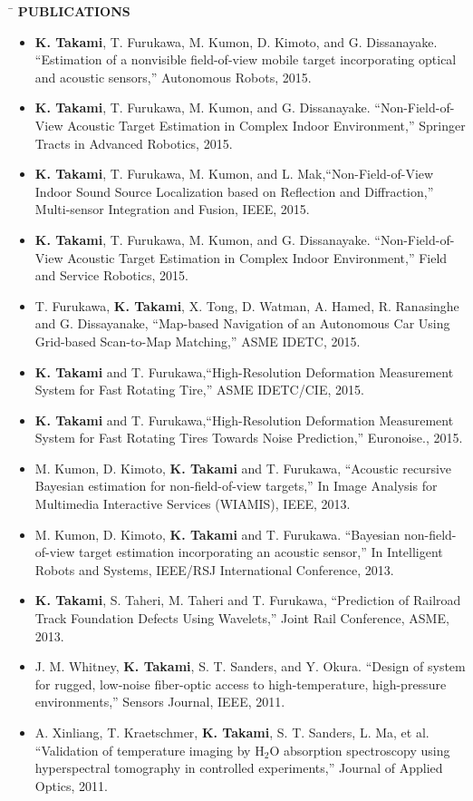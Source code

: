 \documentclass[11pt,letter]{article}
\begin{document}
\begin{tabbing}
	\hspace{2cm}\=\kill
	\>  {\bf \Large PUBLICATIONS}
\end{tabbing}
\vspace{-1.2cm}
\begin{tabbing}
\end{tabbing}
\begin{itemize}[leftmargin=*]
		\item {\bf K. Takami}, T. Furukawa, M. Kumon, D. Kimoto, and G. Dissanayake. ``Estimation of a nonvisible field-of-view mobile target incorporating optical and acoustic sensors,'' Autonomous Robots, 2015.
	\item {\bf K. Takami}, T. Furukawa, M. Kumon, and G. Dissanayake. ``Non-Field-of-View Acoustic Target Estimation in Complex Indoor Environment,'' Springer Tracts in Advanced Robotics, 2015.
	\item  {\bf K. Takami}, T. Furukawa, M. Kumon, and L. Mak,``Non-Field-of-View Indoor Sound Source Localization based on Reflection and Diffraction,'' Multi-sensor Integration and Fusion, IEEE, 2015.
	\item {\bf K. Takami}, T. Furukawa, M. Kumon, and G. Dissanayake. ``Non-Field-of-View Acoustic Target Estimation in Complex Indoor Environment,'' Field and Service Robotics, 2015.
	\item  T. Furukawa, {\bf K. Takami}, X. Tong, D. Watman, A. Hamed, R. Ranasinghe and G. Dissayanake, ``Map-based Navigation of an Autonomous Car Using Grid-based Scan-to-Map Matching,'' ASME IDETC, 2015.
	\item  {\bf K. Takami} and T. Furukawa,``High-Resolution Deformation Measurement System for Fast Rotating Tire,'' ASME IDETC/CIE, 2015.
	\item  {\bf K. Takami} and T. Furukawa,``High-Resolution Deformation Measurement System for Fast Rotating Tires Towards Noise Prediction,'' Euronoise., 2015.
	\item M. Kumon, D. Kimoto, {\bf K. Takami} and T. Furukawa, ``Acoustic recursive Bayesian estimation for non-field-of-view targets,'' In Image Analysis for Multimedia Interactive Services (WIAMIS), IEEE, 2013.
	\item M. Kumon, D. Kimoto, {\bf K. Takami} and T. Furukawa. ``Bayesian non-field-of-view target estimation incorporating an acoustic sensor,'' In Intelligent Robots and Systems, IEEE/RSJ International Conference, 2013.
	\item {\bf K. Takami}, S. Taheri, M. Taheri and T. Furukawa, ``Prediction of Railroad Track Foundation Defects Using Wavelets,'' Joint Rail Conference, ASME, 2013.
	\item J. M. Whitney, {\bf K. Takami}, S. T. Sanders, and Y. Okura. ``Design of system for rugged, low-noise fiber-optic access to high-temperature, high-pressure environments,'' Sensors Journal, IEEE, 2011.
	\item A. Xinliang, T. Kraetschmer, {\bf K. Takami}, S. T. Sanders, L. Ma, et al. ``Validation of temperature imaging by H$_2$O absorption spectroscopy using hyperspectral tomography in controlled experiments,'' Journal of Applied Optics, 2011.
\end{itemize}
\end{document}
